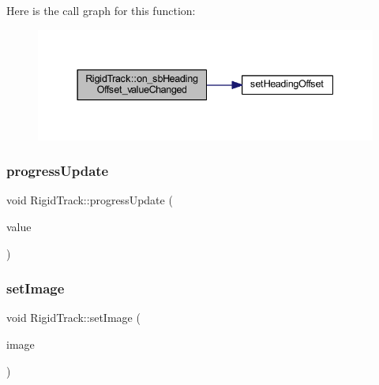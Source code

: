 Here is the call graph for this function\+:\nopagebreak
\begin{figure}[H]
\begin{center}
\leavevmode
\includegraphics[width=337pt]{class_rigid_track_a72e338d6bf93d0efa3bc503f7ca736c5_cgraph}
\end{center}
\end{figure}
\mbox{\label{class_rigid_track_a9d229d23fdf40b988a1743accb695ea8}} 
\subsubsection{\texorpdfstring{progress\+Update}{progressUpdate}}
{\footnotesize\ttfamily void Rigid\+Track\+::progress\+Update (\begin{DoxyParamCaption}\item[{int}]{value }\end{DoxyParamCaption})\hspace{0.3cm}{\ttfamily [slot]}}

\mbox{\label{class_rigid_track_a3b0b3835204cad40abdb144d24aefc76}} 
\subsubsection{\texorpdfstring{set\+Image}{setImage}}
{\footnotesize\ttfamily void Rigid\+Track\+::set\+Image (\begin{DoxyParamCaption}\item[{Q\+Pixmap}]{image }\end{DoxyParamCaption})\hspace{0.3cm}{\ttfamily [slot]}}

\mbox{\label{class_rigid_track_a54a029af74a21f92749e99df7ed847b2}} 
